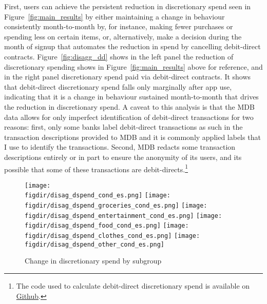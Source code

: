First, users can achieve the persistent reduction in discretionary
spend seen in Figure~\ref{fig:main_results} by either maintaining a change in
behaviour consistently month-to-month by, for instance, making fewer purchases
or spending less on certain items, or, alternatively, make a decision during
the month of signup that automates the reduction in spend by cancelling
debit-direct contracts. Figure~\ref{fig:disagg_dd} shows in the left panel the
reduction of discretionary spending shows in Figure~\ref{fig:main_results}
above for reference, and in the right panel discretionary spend paid via
debit-direct contracts. It shows that debit-direct discretionary spend falls
only marginally after app use, indicating that it is a change in behaviour
sustained month-to-month that drives the reduction in discretionary spend. A
caveat to this analysis is that the MDB data allows for only imperfect
identification of debit-direct transactions for two reasons: first, only some
banks label debit-direct transactions as such in the transaction descriptions
provided to MDB and it is commonly applied labels that I use to identify the
transactions. Second, MDB redacts some transaction descriptions entirely or in
part to ensure the anonymity of its users, and its possible that some of these
transactions are debit-directs.\footnote{The code used to calculate
debit-direct discretionary spend is available on
\href{https://github.com/fabiangunzinger/mdb_eval/blob/f31bfcd7a330188cdd27968d41957ebf5b454099/src/data/aggregators.py\#L461}{Github}.}

\begin{figure}[h]
    \centering
    \caption{Change in discretionary spend by subgroup}%
    \label{fig:disagg_groups}
    \texttt{[image: \\figdir/disag\_dspend\_cond\_es.png]}
    \texttt{[image: \\figdir/disag\_dspend\_groceries\_cond\_es.png]}
    \texttt{[image: \\figdir/disag\_dspend\_entertainment\_cond\_es.png]}
    \texttt{[image: \\figdir/disag\_dspend\_food\_cond\_es.png]}
    \texttt{[image: \\figdir/disag\_dspend\_clothes\_cond\_es.png]}
    \texttt{[image: \\figdir/disag\_dspend\_other\_cond\_es.png]}
\end{figure}

